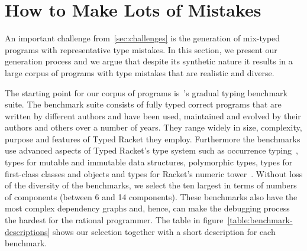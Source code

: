 \section{How to Make Lots of Mistakes} \label{sec:mutate}

An important challenge from~\ref{sec:challenges} is the generation of
mix-typed programs with representative type mistakes. In this section, we
present our generation process and we argue that despite its synthetic
nature it results in a large corpus of programs with type mistakes that
are realistic and diverse.

The starting point for our corpus of programs
is~\citet{gtnffvf-jfp-2019}'s gradual typing benchmark suite. The
benchmark suite consists of fully typed correct programs that are written by different authors
and have been used, maintained and evolved by their authors and others over a
number of years.  They range widely in size, complexity, purpose and
features of Typed Racket they employ.  Furthermore the benchmarks use advanced aspects 
of Typed Racket's type system such as occurrence
typing~\cite{tf-icfp-2010}, types for mutable and immutable data
structures, polymorphic types, types for first-class classes and objects and types for
Racket's numeric tower~\cite{stathff-padl-12}. Without loss of the diversity of the benchmarks,
we select the ten largest in terms of numbers of components (between 6 and 14 components).
These benchmarks also have the most complex dependency graphs and, hence, 
can make the debugging process the hardest for the rational programmer. 
The table in figure~\ref{table:benchmark-descriptions} shows our selection
together with a short description for each benchmark.  


